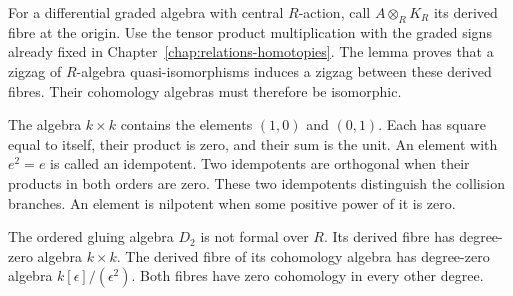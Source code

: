 For a differential graded algebra with central $R$-action, call
$A\otimes_RK_R$ its derived fibre at the origin.
Use the tensor product multiplication with the graded signs already
fixed in Chapter~\ref{chap:relations-homotopies}.
The lemma proves that a zigzag of $R$-algebra quasi-isomorphisms
induces a zigzag between these derived fibres.
Their cohomology algebras must therefore be isomorphic.

The algebra $k\times k$ contains the elements $(1,0)$ and $(0,1)$.
Each has square equal to itself, their product is zero, and their sum
is the unit. An element with $e^2=e$ is called an idempotent.
Two idempotents are orthogonal when their products in both orders
are zero. These two idempotents distinguish the collision branches.
An element is nilpotent when some positive power of it is zero.

\begin{theorem}\label{thm:ocr-relative-nonformality}
The ordered gluing algebra $D_2$ is not formal over $R$.
Its derived fibre has degree-zero algebra $k\times k$.
The derived fibre of its cohomology algebra has degree-zero algebra
$k[\epsilon]/(\epsilon^2)$.
Both fibres have zero cohomology in every other degree.
\end{theorem}

